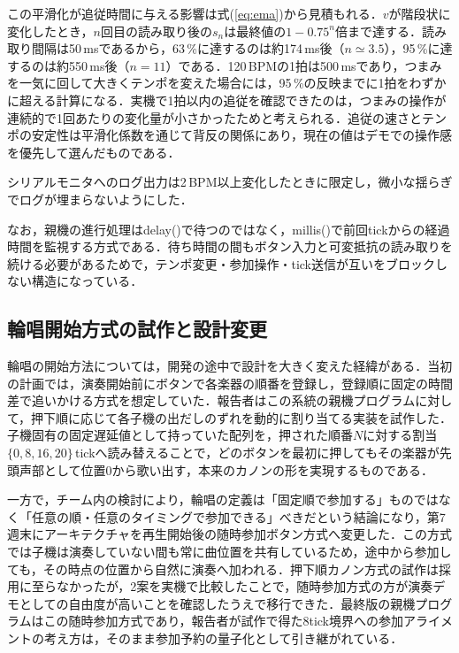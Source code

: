 \documentclass[uplatex,dvipdfmx]{jlreq}
\begin{document}
この平滑化が追従時間に与える影響は式(\ref{eq:ema})から見積もれる．$v$が階段状に変化したとき，$n$回目の読み取り後の$s_n$は最終値の$1-0.75^{n}$倍まで達する．読み取り間隔は50\,msであるから，63\,\%に達するのは約174\,ms後（$n \simeq 3.5$），95\,\%に達するのは約550\,ms後（$n = 11$）である．120\,BPMの1拍は500\,msであり，つまみを一気に回して大きくテンポを変えた場合には，95\,\%の反映までに1拍をわずかに超える計算になる．実機で1拍以内の追従を確認できたのは，つまみの操作が連続的で1回あたりの変化量が小さかったためと考えられる．追従の速さとテンポの安定性は平滑化係数を通じて背反の関係にあり，現在の値はデモでの操作感を優先して選んだものである．

シリアルモニタへのログ出力は2\,BPM以上変化したときに限定し，微小な揺らぎでログが埋まらないようにした．

なお，親機の進行処理はdelay()で待つのではなく，millis()で前回tickからの経過時間を監視する方式である．待ち時間の間もボタン入力と可変抵抗の読み取りを続ける必要があるためで，テンポ変更・参加操作・tick送信が互いをブロックしない構造になっている．

\subsection{輪唱開始方式の試作と設計変更}
\label{sec:design-change}

輪唱の開始方法については，開発の途中で設計を大きく変えた経緯がある．当初の計画では，演奏開始前にボタンで各楽器の順番を登録し，登録順に固定の時間差で追いかける方式を想定していた．報告者はこの系統の親機プログラムに対して，押下順に応じて各子機の出だしのずれを動的に割り当てる実装を試作した．子機固有の固定遅延値として持っていた配列を，押された順番$N$に対する割当$\{0, 8, 16, 20\}$\,tickへ読み替えることで，どのボタンを最初に押してもその楽器が先頭声部として位置0から歌い出す，本来のカノンの形を実現するものである．

一方で，チーム内の検討により，輪唱の定義は「固定順で参加する」ものではなく「任意の順・任意のタイミングで参加できる」べきだという結論になり，第7週末にアーキテクチャを再生開始後の随時参加ボタン方式へ変更した．この方式では子機は演奏していない間も常に曲位置を共有しているため，途中から参加しても，その時点の位置から自然に演奏へ加われる．押下順カノン方式の試作は採用に至らなかったが，2案を実機で比較したことで，随時参加方式の方が演奏デモとしての自由度が高いことを確認したうえで移行できた．最終版の親機プログラムはこの随時参加方式であり，報告者が試作で得た8tick境界への参加アライメントの考え方は，そのまま参加予約の量子化として引き継がれている．
\end{document}
